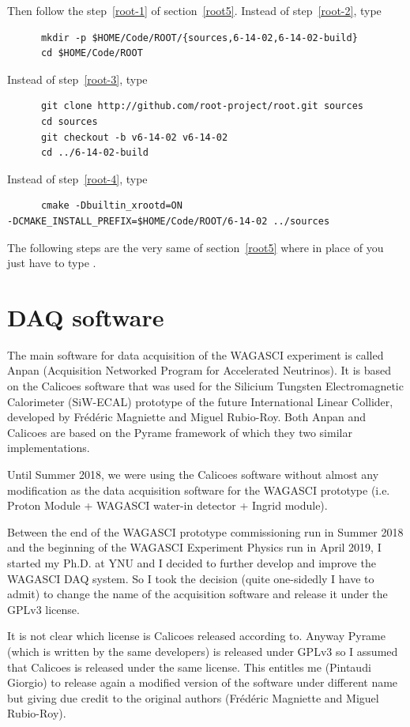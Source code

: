 Then follow the step~\ref{root-1} of section~\ref{root5}. Instead of step~\ref{root-2}, type
\begin{lstlisting}
      mkdir -p $HOME/Code/ROOT/{sources,6-14-02,6-14-02-build}
      cd $HOME/Code/ROOT
\end{lstlisting}
Instead of step~\ref{root-3}, type
\begin{lstlisting}
      git clone http://github.com/root-project/root.git sources
      cd sources
      git checkout -b v6-14-02 v6-14-02
      cd ../6-14-02-build
\end{lstlisting}
Instead of step~\ref{root-4}, type
\begin{lstlisting}
      cmake -Dbuiltin_xrootd=ON
-DCMAKE_INSTALL_PREFIX=$HOME/Code/ROOT/6-14-02 ../sources
\end{lstlisting}

The following steps are the very same of section~\ref{root5} where in
place of  you just have to type
.

\chapter{DAQ software}
The main software for data acquisition of the WAGASCI experiment is
called Anpan (Acquisition Networked Program for Accelerated
Neutrinos). It is based on the Calicoes software that was used for the
Silicium Tungsten Electromagnetic Calorimeter (SiW-ECAL) prototype of
the future International Linear Collider, developed by Frédéric
Magniette and Miguel Rubio-Roy. Both Anpan and Calicoes are based on
the Pyrame framework of which they two similar implementations.

Until Summer 2018, we were using the Calicoes software without almost
any modification as the data acquisition software for the WAGASCI
prototype (i.e. Proton Module + WAGASCI water-in detector + Ingrid
module).

Between the end of the WAGASCI prototype commissioning run in Summer
2018 and the beginning of the WAGASCI Experiment Physics run in April
2019, I started my Ph.D. at YNU and I decided to further develop and
improve the WAGASCI DAQ system. So I took the decision (quite
one-sidedly I have to admit) to change the name of the acquisition
software and release it under the GPLv3 license.

It is not clear which license is Calicoes released according
to. Anyway Pyrame (which is written by the same developers) is
released under GPLv3 so I assumed that Calicoes is released under the
same license. This entitles me (Pintaudi Giorgio) to release again a
modified version of the software under different name but giving due
credit to the original authors (Frédéric Magniette and Miguel
Rubio-Roy).

